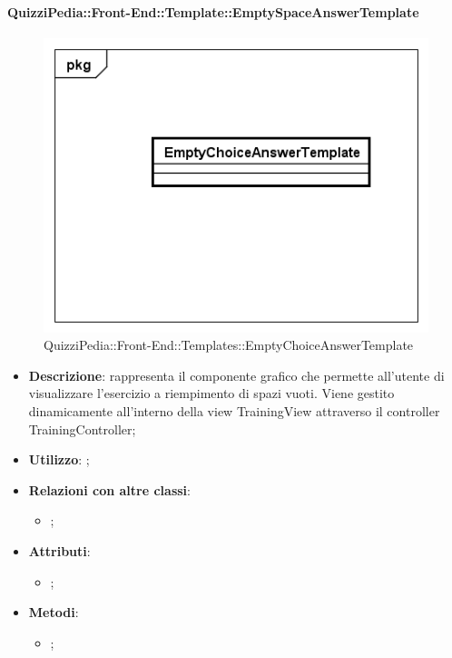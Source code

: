 		\paragraph{QuizziPedia::Front-End::Template::EmptySpaceAnswerTemplate}
		
		\label{QuizziPedia::Front-End::Templates::EmptySpaceAnswerTemplate}
		
		\begin{figure}[h]
			\centering
			\includegraphics[scale=0.5,keepaspectratio]{UML/Classi/Front-End/QuizziPedia_Front-end_Templates_EmptySpaceAnswerTemplate.png}
			\caption{QuizziPedia::Front-End::Templates::EmptyChoiceAnswerTemplate}
		\end{figure}
		
		\begin{itemize}
			\item \textbf{Descrizione}: rappresenta il componente grafico che permette all'utente di visualizzare l'esercizio a riempimento di spazi vuoti. Viene gestito dinamicamente all'interno della view TrainingView attraverso il controller TrainingController;
			\item \textbf{Utilizzo}: ;
			\item \textbf{Relazioni con altre classi}: 
			\begin{itemize}
				\item ;
			\end{itemize}
			\item \textbf{Attributi}: 
			\begin{itemize}
				\item ;
			\end{itemize}
			\item \textbf{Metodi}: 
			\begin{itemize}
				\item ;
			\end{itemize}
		\end{itemize}
		
